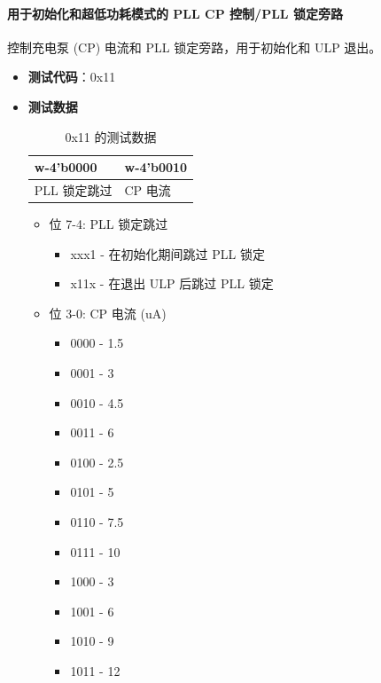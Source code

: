 \documentclass[main\_\_CN.tex]{subfiles}
\begin{document}
\paragraph{用于初始化和超低功耗模式的 PLL CP 控制/PLL 锁定旁路}
\label{sec:test-code-0x11}
控制充电泵 (CP) 电流和 PLL 锁定旁路，用于初始化和 ULP 退出。

\begin{itemize}
    \item \textbf{测试代码}：0x11
    \item \textbf{测试数据}
        \begin{longtable}{ |p{6cm}|p{6cm}|}
            \caption{0x11 的测试数据}
            \label{tab:test-data-0x11} \\
            \hline
            \rowcolor{lightgray}
            \textbf{w-4'b0000} & \textbf{w-4'b0010} \\ \hline
            PLL 锁定跳过 & CP 电流  \\ \hline
        \end{longtable}
        \begin{itemize}
            \item 位 7-4: PLL 锁定跳过
                \begin{itemize}
                    \item xxx1 - 在初始化期间跳过 PLL 锁定
                    \item x11x - 在退出 ULP 后跳过 PLL 锁定
                \end{itemize}
            \item 位 3-0: CP 电流 (uA)
                \begin{itemize}
                    \item 0000 - 1.5
                    \item 0001 - 3
                    \item 0010 - 4.5
                    \item 0011 - 6
                    \item 0100 - 2.5
                    \item 0101 - 5
                    \item 0110 - 7.5
                    \item 0111 - 10
                    \item 1000 - 3
                    \item 1001 - 6
                    \item 1010 - 9
                    \item 1011 - 12

\end{itemize}
\end{itemize}
\end{itemize}
\end{document}
